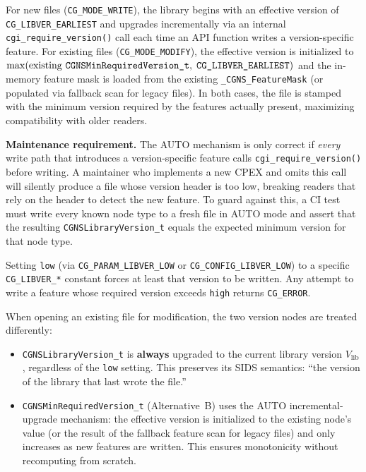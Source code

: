 \documentclass[11pt,letterpaper]{article}
\begin{document}
\begin{description}[leftmargin=2em]
\item[\texttt{low~=~CG\_LIBVER\_AUTO} (default).]
  For new files (\texttt{CG\_MODE\_WRITE}), the library begins with an
  effective version of \texttt{CG\_LIBVER\_EARLIEST} and upgrades
  incrementally via an internal \texttt{cgi\_require\_version()} call
  each time an API function writes a version-specific feature.  For
  existing files (\texttt{CG\_MODE\_MODIFY}), the effective version is
  initialized to $\max(\text{existing~\texttt{CGNSMinRequiredVersion\_t}},\;
  \texttt{CG\_LIBVER\_EARLIEST})$ and the in-memory feature mask is
  loaded from the existing \texttt{\_CGNS\_FeatureMask} (or populated
  via fallback scan for legacy files).  In both cases, the file is
  stamped with the minimum version required by the features actually
  present, maximizing compatibility with older readers.

  \textbf{Maintenance requirement.}  The AUTO mechanism is only
  correct if \emph{every} write path that introduces a version-specific
  feature calls \texttt{cgi\_require\_version()} before writing.  A
  maintainer who implements a new CPEX and omits this call will
  silently produce a file whose version header is too low, breaking
  readers that rely on the header to detect the new feature.  To guard
  against this, a CI test must write every known node type to a fresh
  file in AUTO mode and assert that the resulting
  \texttt{CGNSLibraryVersion\_t} equals the expected minimum version
  for that node type.

\item[\texttt{low~=} explicit version constant.]
  Setting \texttt{low} (via \texttt{CG\_PARAM\_LIBVER\_LOW} or
  \texttt{CG\_CONFIG\_LIBVER\_LOW}) to a specific
  \texttt{CG\_LIBVER\_*} constant forces at least that version to be
  written.  Any attempt to write a feature whose required version
  exceeds \texttt{high} returns \texttt{CG\_ERROR}.

\item[\texttt{CG\_MODE\_MODIFY} handling.]
  When opening an existing file for modification, the two version
  nodes are treated differently:
  \begin{itemize}[leftmargin=1.5em]
  \item \texttt{CGNSLibraryVersion\_t} is \textbf{always} upgraded to
    the current library version $V_{\mathrm{lib}}$, regardless of the
    \texttt{low} setting.  This preserves its SIDS semantics: ``the
    version of the library that last wrote the file.''
  \item \texttt{CGNSMinRequiredVersion\_t} (Alternative~B) uses the
    AUTO incremental-upgrade mechanism: the effective version is
    initialized to the existing node's value (or the result of the
    fallback feature scan for legacy files) and only increases as new
    features are written.  This ensures monotonicity without
    recomputing from scratch.
  \end{itemize}
\end{description}
\end{document}
